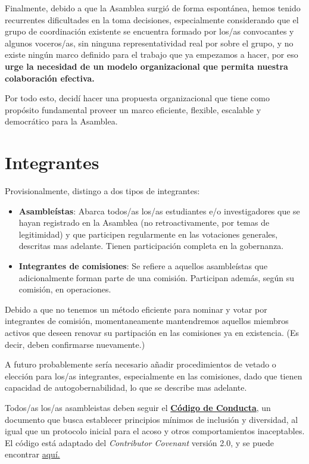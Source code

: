 \documentclass[justified]{tufte-handout} %
\begin{document}
Finalmente, debido a que la Asamblea surgió de forma espontánea, hemos tenido recurrentes dificultades en la toma decisiones, especialmente considerando que el grupo de coordinación existente se encuentra formado por los/as convocantes y algunos voceros/as, sin ninguna representatividad real por sobre el grupo, y no existe ningún marco definido para el trabajo que ya empezamos a hacer, por eso \textbf{urge la necesidad de un modelo organizacional que permita nuestra colaboración efectiva.}

Por todo esto, decidí hacer una propuesta organizacional que tiene como propósito fundamental proveer un marco eficiente, flexible, escalable y democrático para la Asamblea.
\pagebreak

\section{Integrantes}\label{sec:integrantes}

Provisionalmente, distingo a dos tipos de integrantes:
\begin{itemize}
	\item \textbf{Asambleístas}: Abarca todos/as los/as estudiantes e/o investigadores que se hayan registrado en la Asamblea (no retroactivamente, por temas de legitimidad) y que participen regularmente en las votaciones generales, descritas mas adelante. Tienen participación completa en la gobernanza.
	\item \textbf{Integrantes de comisiones}: Se refiere a aquellos asambleístas que adicionalmente forman parte de una comisión. Participan además, según su comisión, en operaciones.
\end{itemize}
Debido a que no tenemos un método eficiente para nominar y votar por integrantes de comisión, momentaneamente mantendremos aquellos miembros activos que deseen renovar su partipación en las comisiones ya en existencia. (Es decir, deben confirmarse nuevamente.)

A futuro probablemente sería necesario añadir procedimientos de vetado o elección para los/as integrantes, especialmente en las comisiones, dado que tienen capacidad de autogobernabilidad, lo que se describe mas adelante.

Todos/as los/as asambleistas deben seguir el \href{https://github.com/agucova/propuesta-acic/blob/master/conducta.md}{\textbf{Código de Conducta}}, un documento que busca establecer principios mínimos de inclusión y diversidad, al igual que un protocolo inicial para el acoso y otros comportamientos inaceptables. El código está adaptado del \textit{Contributor Covenant} versión 2.0, y se puede encontrar \href{https://github.com/agucova/propuesta-acic/blob/master/conducta.md}{aquí.}
\end{document}
